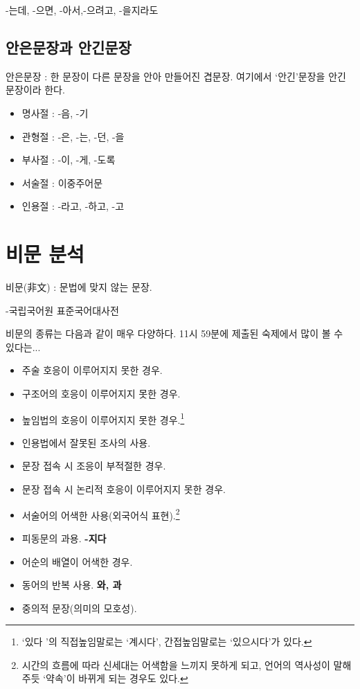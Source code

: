 \documentclass[10pt]{report}
\newcommand{\tl}{\textquoteleft}
\newcommand{\tr}{\textquoteright}
\begin{document}
-는데, -으면, -아서,-으려고, -을지라도
\subsection{안은문장과 안긴문장}
안은문장 : 한 문장이 다른 문장을 안아 만들어진 겹문장. 여기에서 \tl 안긴\tr  문장을 안긴문장이라 한다.
\begin{itemize}
\item 명사절 : -음, -기
\item 관형절 : -은, -는, -던, -을
\item 부사절 : -이, -게, -도록
\item 서술절 : 이중주어문
\item 인용절 : -라고, -하고, -고
\end{itemize}
\section{비문 분석}
\begin{center}
	비문(非文) : 문법에 맞지 않는 문장.
	\begin{flushright}
		\small -국립국어원 표준국어대사전
	\end{flushright}
\end{center}
비문의 종류는 다음과 같이 매우 다양하다. 11시 59분에 제출된 숙제에서 많이 볼 수 있다는...
\begin{itemize}
\item 주술 호응이 이루어지지 못한 경우.

\item 구조어의 호응이 이루어지지 못한 경우.

\item 높임법의 호응이 이루어지지 못한 경우.\footnote{\tl 있다 \tr 의 직접높임말로는 \tl 계시다\tr, 간접높임말로는 \tl 있으시다\tr  가 있다.}

\item 인용법에서 잘못된 조사의 사용.

\item 문장 접속 시 조응이 부적절한 경우.

\item 문장 접속 시 논리적 호응이 이루어지지 못한 경우.

\item 서술어의 어색한 사용(외국어식 표현).\footnote{시간의 흐름에 따라 신세대는 어색함을 느끼지 못하게 되고, 언어의 역사성이 말해주듯 \tl 약속\tr  이 바뀌게 되는 경우도 있다.}

\item 피동문의 과용. \textbf{-지다}

\item 어순의 배열이 어색한 경우.

\item 동어의 반복 사용. \textbf{와, 과}

\item 중의적 문장(의미의 모호성).

\end{itemize}
\end{document}
